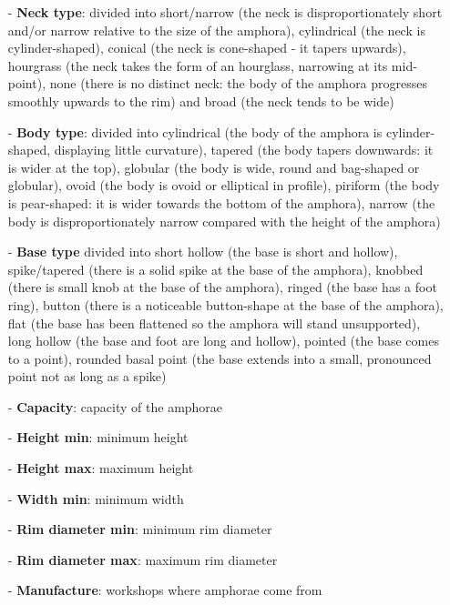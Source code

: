 \documentclass[10pt,a4paper]{article}
\begin{document}
\begin{itemize}
\item[-] \textbf{Neck type}: divided into short/narrow (the neck is disproportionately short and/or narrow relative to the size of the amphora), cylindrical (the neck is cylinder-shaped), conical (the neck is cone-shaped - it tapers upwards), hourgrass (the neck takes the form of an hourglass, narrowing at its mid-point), none (there is no distinct neck: the body of the amphora progresses smoothly upwards to the rim) and broad (the neck tends to be wide)

\item[-] \textbf{Body type}: divided into cylindrical (the body of the amphora is cylinder-shaped, displaying little curvature), tapered (the body tapers downwards: it is wider at the top), globular (the body is wide, round and bag-shaped or globular), ovoid (the body is ovoid or elliptical in profile), piriform (the body is pear-shaped: it is wider towards the bottom of the amphora), narrow (the body is disproportionately narrow compared with the height of the amphora)

\item[-] \textbf{Base type} divided into short hollow (the base is short and hollow), spike/tapered (there is a solid spike at the base of the amphora), knobbed (there is small knob at the base of the amphora), ringed (the base has a foot ring), button (there is a noticeable button-shape at the base of the amphora), flat (the base has been flattened so the amphora will stand unsupported), long hollow (the base and foot are long and hollow), pointed (the base comes to a point), rounded basal point (the base extends into a small, pronounced point not as long as a spike)

\item[-] \textbf{Capacity}: capacity of the amphorae

\item[-] \textbf{Height min}: minimum height

\item[-] \textbf{Height max}: maximum height

\item[-] \textbf{Width min}: minimum width

\item[-] \textbf{Rim diameter min}: minimum rim diameter

\item[-] \textbf{Rim diameter max}: maximum rim diameter

\item[-] \textbf{Manufacture}: workshops where amphorae come from 

\end{itemize}
\end{document}
